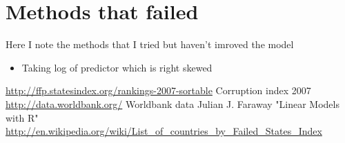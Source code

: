 \documentclass[a4paper]{article}
\begin{document}
\section{Methods that failed}
Here I note the methods that I tried but haven't imroved the model
\begin{itemize}
  \item Taking log of predictor which is right skewed
\end{itemize}
 
\begin{thebibliography}{9}
  \url{http://ffp.statesindex.org/rankings-2007-sortable} Corruption index 2007
  \url{http://data.worldbank.org/} Worldbank data
   Julian J. Faraway "Linear Models with R"
  \url{http://en.wikipedia.org/wiki/List_of_countries_by_Failed_States_Index}
\end{thebibliography}
\end{document}
